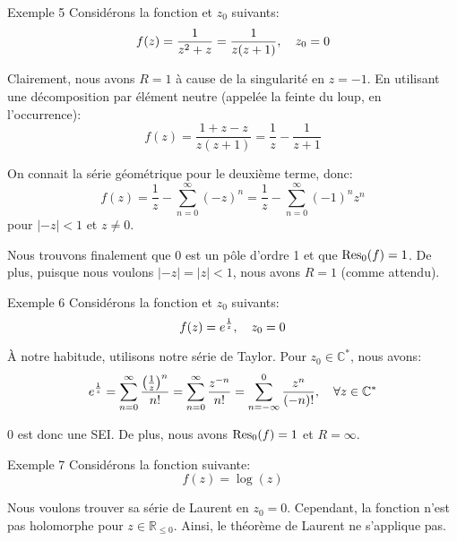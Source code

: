 \documentclass[a4paper]{article}
\begin{document}
\begin{parag}{Exemple 5}
    Considérons la fonction et $z_0$ suivants: 
    \[f\left(z\right) = \frac{1}{z^2 + z} = \frac{1}{z\left(z + 1\right)}, \mathspace z_0 = 0\]
    
    Clairement, nous avons $R = 1$ à cause de la singularité en $z = -1$. En utilisant une décomposition par élément neutre (appelée la feinte du loup, en l'occurrence): 
    \[f\left(z\right) = \frac{1 + z - z}{z\left(z+1\right)} = \frac{1}{z} - \frac{1}{z+1}\]
    
    On connait la série géométrique pour le deuxième terme, donc: 
    \[f\left(z\right) = \frac{1}{z} - \sum_{n=0}^{\infty} \left(-z\right)^n = \frac{1}{z} - \sum_{n=0}^{\infty} \left(-1\right)^n z^n\]
    pour $\left|-z\right| < 1$ et $z \neq 0$. 

    Nous trouvons finalement que $0$ est un pôle d'ordre 1 et que $\Res_0\left(f\right) = 1$. De plus, puisque nous voulons $\left|-z\right| = \left|z\right| < 1$, nous avons $R = 1$ (comme attendu).
\end{parag}

\begin{parag}{Exemple 6}
    Considérons la fonction et $z_0$ suivants: 
    \[f\left(z\right) = e^{\frac{1}{z}}, \mathspace z_0 = 0\]
    
    À notre habitude, utilisons notre série de Taylor. Pour $z_0 \in \mathbb{C}^*$, nous avons: 
    \[e^{\frac{1}{z}} = \sum_{n=0}^{\infty} \frac{\left(\frac{1}{z}\right)^{n}}{n!} = \sum_{n=0}^{\infty} \frac{z^{-n}}{n!} = \sum_{n=-\infty}^{0} \frac{z^{n}}{\left(-n\right)!}, \mathspace \forall z \in \mathbb{C}^*\]
    
    0 est donc une SEI. De plus, nous avons $\Res_0\left(f\right) = 1$ et $R = \infty$.
\end{parag}

\begin{parag}{Exemple 7}
    Considérons la fonction suivante: 
    \[f\left(z\right) = \log\left(z\right)\]
    
    Nous voulons trouver sa série de Laurent en $z_0 = 0$. Cependant, la fonction n'est pas holomorphe pour $z \in \mathbb{R}_{\leq 0}$. Ainsi, le théorème de Laurent ne s'applique pas.
\end{parag}
\end{document}
